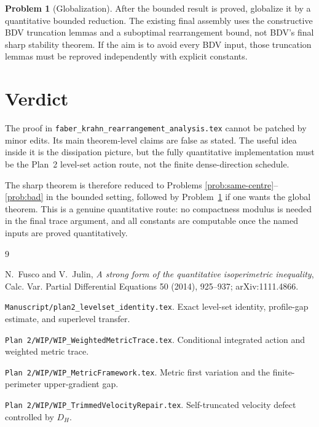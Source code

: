 \documentclass[11pt]{article}
\theoremstyle{definition}
\newtheorem{problem}[theorem]{Problem}
\begin{document}
\begin{problem}[Globalization]\label{prob:global}
After the bounded result is proved, globalize it by a quantitative
bounded reduction.  The existing final assembly uses the constructive BDV
truncation lemmas and a suboptimal rearrangement bound, not BDV's final
sharp stability theorem.  If the aim is to avoid every BDV input, those
truncation lemmas must be reproved independently with explicit constants.
\end{problem}

\section{Verdict}

The proof in \texttt{faber\_krahn\_rearrangement\_analysis.tex} cannot be
patched by minor edits.  Its main theorem-level claims are false as
stated.  The useful idea inside it is the dissipation picture, but the
fully quantitative implementation must be the Plan~2 level-set action
route, not the finite dense-direction schedule.

The sharp theorem is therefore reduced to Problems
\ref{prob:same-centre}--\ref{prob:bad} in the bounded setting, followed
by Problem~\ref{prob:global} if one wants the global theorem.  This is a
genuine quantitative route: no compactness modulus is needed in the final
trace argument, and all constants are computable once the named inputs
are proved quantitatively.

\begin{thebibliography}{9}

N.~Fusco and V.~Julin,
\emph{A strong form of the quantitative isoperimetric inequality},
Calc. Var. Partial Differential Equations 50 (2014), 925--937;
arXiv:1111.4866.

\texttt{Manuscript/plan2\_levelset\_identity.tex}.
Exact level-set identity, profile-gap estimate, and superlevel transfer.

\texttt{Plan 2/WIP/WIP\_WeightedMetricTrace.tex}.
Conditional integrated action and weighted metric trace.

\texttt{Plan 2/WIP/WIP\_MetricFramework.tex}.
Metric first variation and the finite-perimeter upper-gradient gap.

\texttt{Plan 2/WIP/WIP\_TrimmedVelocityRepair.tex}.
Self-truncated velocity defect controlled by \(D_H\).

\end{thebibliography}
\end{document}
